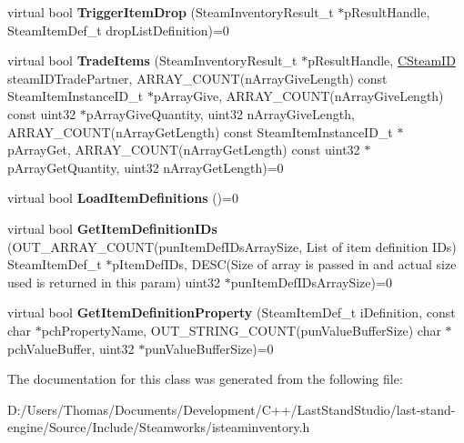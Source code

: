 \begin{DoxyCompactItemize}
\item 
\hypertarget{classISteamInventory_a65c5ebcab08c5955cfc561de40819eaa}{}virtual bool {\bfseries Trigger\+Item\+Drop} (Steam\+Inventory\+Result\+\_\+t $\ast$p\+Result\+Handle, Steam\+Item\+Def\+\_\+t drop\+List\+Definition)=0\label{classISteamInventory_a65c5ebcab08c5955cfc561de40819eaa}

\item 
\hypertarget{classISteamInventory_af2a4c2333150d56f310b7710b7c15bc6}{}virtual bool {\bfseries Trade\+Items} (Steam\+Inventory\+Result\+\_\+t $\ast$p\+Result\+Handle, \hyperlink{classCSteamID}{C\+Steam\+I\+D} steam\+I\+D\+Trade\+Partner, A\+R\+R\+A\+Y\+\_\+\+C\+O\+U\+N\+T(n\+Array\+Give\+Length) const Steam\+Item\+Instance\+I\+D\+\_\+t $\ast$p\+Array\+Give, A\+R\+R\+A\+Y\+\_\+\+C\+O\+U\+N\+T(n\+Array\+Give\+Length) const uint32 $\ast$p\+Array\+Give\+Quantity, uint32 n\+Array\+Give\+Length, A\+R\+R\+A\+Y\+\_\+\+C\+O\+U\+N\+T(n\+Array\+Get\+Length) const Steam\+Item\+Instance\+I\+D\+\_\+t $\ast$p\+Array\+Get, A\+R\+R\+A\+Y\+\_\+\+C\+O\+U\+N\+T(n\+Array\+Get\+Length) const uint32 $\ast$p\+Array\+Get\+Quantity, uint32 n\+Array\+Get\+Length)=0\label{classISteamInventory_af2a4c2333150d56f310b7710b7c15bc6}

\item 
\hypertarget{classISteamInventory_a44c3026d0d474f98bcd27d9fb9996744}{}virtual bool {\bfseries Load\+Item\+Definitions} ()=0\label{classISteamInventory_a44c3026d0d474f98bcd27d9fb9996744}

\item 
\hypertarget{classISteamInventory_a8bdb71b0614f22096b1cece7c3c326bc}{}virtual bool {\bfseries Get\+Item\+Definition\+I\+Ds} (O\+U\+T\+\_\+\+A\+R\+R\+A\+Y\+\_\+\+C\+O\+U\+N\+T(pun\+Item\+Def\+I\+Ds\+Array\+Size, List of item definition I\+Ds) Steam\+Item\+Def\+\_\+t $\ast$p\+Item\+Def\+I\+Ds, D\+E\+S\+C(Size of array is passed in and actual size used is returned in this param) uint32 $\ast$pun\+Item\+Def\+I\+Ds\+Array\+Size)=0\label{classISteamInventory_a8bdb71b0614f22096b1cece7c3c326bc}

\item 
\hypertarget{classISteamInventory_abc205caf8af18fb4c294acf6a8526940}{}virtual bool {\bfseries Get\+Item\+Definition\+Property} (Steam\+Item\+Def\+\_\+t i\+Definition, const char $\ast$pch\+Property\+Name, O\+U\+T\+\_\+\+S\+T\+R\+I\+N\+G\+\_\+\+C\+O\+U\+N\+T(pun\+Value\+Buffer\+Size) char $\ast$pch\+Value\+Buffer, uint32 $\ast$pun\+Value\+Buffer\+Size)=0\label{classISteamInventory_abc205caf8af18fb4c294acf6a8526940}

\end{DoxyCompactItemize}


The documentation for this class was generated from the following file\+:\begin{DoxyCompactItemize}
\item 
D\+:/\+Users/\+Thomas/\+Documents/\+Development/\+C++/\+Last\+Stand\+Studio/last-\/stand-\/engine/\+Source/\+Include/\+Steamworks/isteaminventory.\+h\end{DoxyCompactItemize}
